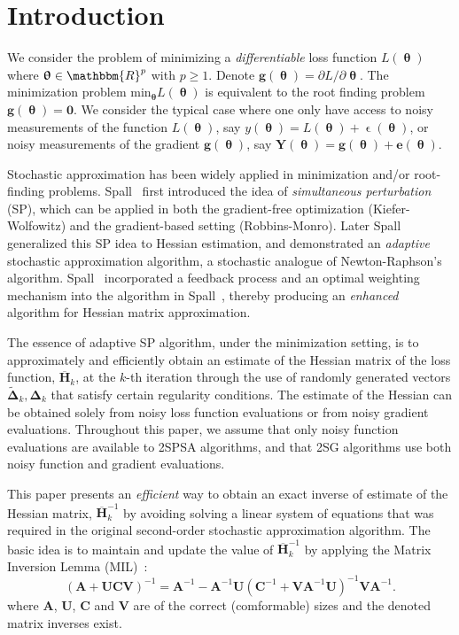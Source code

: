 \documentclass[conference]{IEEEtran}
\newcommand{\bDelta}{\bm{\Delta}}
\newcommand{\oH}{\bm{\overline{H}}}
\newcommand{\tDelta}{\bm{\tilde{\Delta}}}
\begin{document}
\section{Introduction}
\label{Introduction}
We consider the problem of minimizing a
\textit{differentiable} loss function $ L(\bm{\uptheta}) $ where
$ \bm{\uptheta} \in \mathbbm{R}^p $ with $ p\ge1 $. Denote
$\bm{g}(\bm{\uptheta})={\partial L}/{\partial \bm{\uptheta}}$. The
minimization problem ${\text{min}}_{\bm{\uptheta}}L(\bm{\uptheta})$ is
equivalent to the root finding problem $\bm{g}(\bm{\uptheta})=\bm{0}$.
We consider the typical case where one only have access to noisy measurements of
the function $ L(\bm{\uptheta}) $, say
$ y(\bm{\uptheta})=L(\bm{\uptheta})+\upvarepsilon(\bm{\uptheta}) $, or
noisy measurements of the gradient $\bm{g}(\bm{\uptheta})$, say
$\bm{Y}(\bm{\uptheta})=\bm{g}(\bm{\uptheta})+\bm{e}(\bm{\uptheta})$.

Stochastic approximation has been widely applied in minimization and/or
root-finding problems. Spall~\cite{Spall1992} first introduced the
idea of \textit{simultaneous perturbation} (SP), which can be applied
in both the gradient-free optimization (Kiefer-Wolfowitz) and the
gradient-based setting (Robbins-Monro). Later Spall~\cite{Spall2000}
generalized this SP idea to Hessian estimation, and demonstrated an
\textit{adaptive} stochastic approximation algorithm, a stochastic
analogue of Newton-Raphson's algorithm. Spall~\cite{Spall2009}
incorporated a feedback process and an optimal weighting mechanism
into the algorithm in Spall~\cite{Spall2000}, thereby producing an
\textit{enhanced} algorithm for Hessian matrix approximation.

The essence of adaptive SP algorithm, under the minimization setting,
is to approximately and efficiently obtain an estimate of the
Hessian matrix of the loss function, $\oH_k$, at the $k$-th
iteration through the use of randomly generated
vectors $\tDelta_k, \bDelta_k$ that satisfy certain regularity
conditions. The estimate of the Hessian can be obtained solely from
noisy loss function evaluations or from noisy gradient
evaluations. Throughout this paper, we assume that only noisy function
evaluations are available to 2SPSA algorithms, and that 2SG algorithms use both noisy
function and gradient evaluations.

This paper presents an \textit{efficient} way to obtain an exact inverse of
estimate of the Hessian matrix, $\oH_k^{-1}$ by avoiding solving a
linear system of equations that was required in the original second-order stochastic
approximation algorithm. The basic idea is to maintain and update the
value of $\oH_k^{-1}$ by applying the Matrix Inversion Lemma (MIL)~\cite{Woodbury1950}:
\begin{equation}
\label{eq:MatrixInversion}
(\bm{A}+\bm{UCV})^{-1}=\bm{A}^{-1}-\bm{A}^{-1}\bm{U}(\bm{C}^{-1}+\bm{V}\bm{A}^{-1}\bm{U})^{-1}\bm{V}\bm{A}^{-1}.
\end{equation}
where $\bm{A}$, $\bm{U}$, $\bm{C}$ and $\bm{V}$
are of the correct (comformable) sizes and the denoted matrix inverses
exist.
\end{document}
